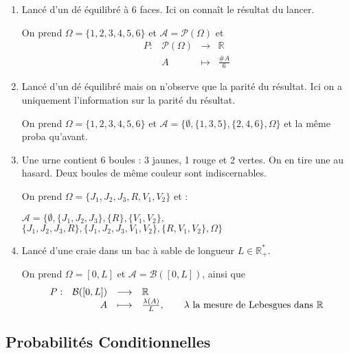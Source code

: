 \documentclass[12pt]{article}
\newcommand{\shift}{\hspace{2em}}
\newcommand{\bb}[1]{\mathbb{#1}} %
\newcommand{\R}{\bb{R}} %
\newcommand{\1}{\bb{1}} %
\begin{document}
\begin{enumerate}
        \item Lancé d'un dé équilibré à 6 faces. Ici on connaît le résultat du lancer.
        
        On prend \(\Omega=\{1,2,3,4,5,6\}\) et \(\mathcal A=\mathcal P(\Omega)\) et
        \[\begin{array}{rrcl}
            P: & \mathcal P(\Omega) & \longrightarrow & \mathbb R \\
            & A & \longmapsto & \frac{\#A}{6}
        \end{array}\]
        \item Lancé d'un dé équilibré mais on n'observe que la parité du résultat. Ici on a uniquement l'information sur la parité du résultat.
    
        On prend \(\Omega=\{1,2,3,4,5,6\}\) et \(\mathcal A=\{\emptyset,\{1,3,5\},\{2,4,6\},\Omega\}\) et la même proba qu'avant.
    
        \item Une urne contient 6 boules : 3 jaunes, 1 rouge et 2 vertes. On en tire une au hasard. Deux boules de même couleur sont indiscernables.
    
        On prend \(\Omega=\{J_1,J_2,J_3,R,V_1,V_2\}\) et :
        \begin{center}
            \(\mathcal A=\Big\{\emptyset,\{J_1,J_2,J_3\},\{R\},\{V_1,V_2\},\) \(\{J_1,J_2,J_3,R\},\{J_1,J_2,J_3,V_1,V_2\},\{R,V_1,V_2\},\Omega\Big\}\)
        \end{center}
    
        \item Lancé d'une craie dans un bac à sable de longueur \(L\in\mathbb R_+^*\).
    
        On prend \(\Omega=[0,L]\) et \(\mathcal A=\mathcal B([0,L])\), ainsi que
        \[\begin{array}{rrcl}
            P: & \mathcal B([0,L]) & \longrightarrow & \mathbb R \\
            & A & \longmapsto & \frac{\lambda(A)}L, \text{\shift $\lambda$ la mesure de Lebesgues dans $\R$}
        \end{array}\]
    \end{enumerate}



\subsection{Probabilités Conditionnelles} 
\end{document}

